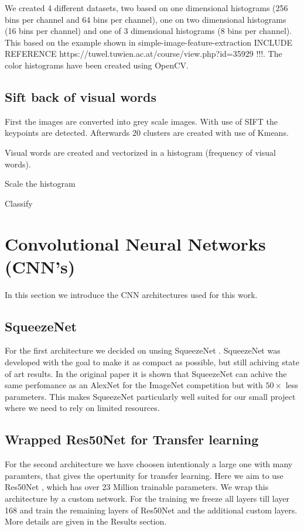 \documentclass[11pt]{article}
\begin{document}
We created 4 different datasets, two based on one dimensional histograms (256 bins per channel and 64 bins per channel), one on two dimensional histograms (16 bins per channel) and one of 3 dimensional histograms (8 bins per channel). This based on the example shown in simple-image-feature-extraction INCLUDE REFERENCE https://tuwel.tuwien.ac.at/course/view.php?id=35929 !!!. The color histograms have been created using OpenCV. 

\subsection{Sift back of visual words}
First the images are converted into grey scale images. With use of SIFT the keypoints are detected. Afterwards 20 clusters are created with use of Kmeans.

Visual words are created and vectorized in a histogram (frequency of visual words). 

Scale the histogram 

Classify


\section{Convolutional Neural Networks (CNN's)}
In this section we introduce the CNN architectures used for this work.

\subsection{SqueezeNet}
For the first architecture we decided on unsing SqueezeNet \cite{iandola2016}. SqueezeNet was developed with the goal to make it as compact as possible, but still achiving state of art results. In the original paper it is shown that SqueezeNet can achive the same perfomance as an AlexNet for the ImageNet competition but with $50\times$ less parameters. This makes SqueezeNet particularly well suited for our small project where we need to rely on limited resources.


\subsection{Wrapped Res50Net for Transfer learning}
For the second architecture we have choosen intentionaly a large one with many paramters, that gives the opertunity for transfer learning. Here we aim to use Res50Net \cite{he2016deep}, which has over 23 Million trainable parameters. We wrap this architecture by a custom network. For the training we freeze all layers till layer 168 and train the remaining layers of Res50Net and the additional custom layers. More details are given in the Results section.
\end{document}
